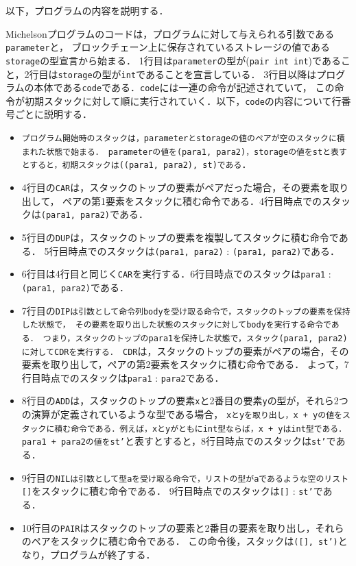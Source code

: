 \documentclass{kuisthesis}
\begin{document}
以下，プログラムの内容を説明する．

Michelsonプログラムのコードは，プログラムに対して与えられる引数である{\tt parameter}と，
ブロックチェーン上に保存されているストレージの値である{\tt storage}の型宣言から始まる．
1行目は{\tt parameter}の型が({\tt pair int int})であること，2行目は{\tt storage}の型が{\tt int}であることを宣言している．
3行目以降はプログラムの本体である{\tt code}である．{\tt code}には一連の命令が記述されていて，
この命令が初期スタックに対して順に実行されていく．以下，{\tt code}の内容について行番号ごとに説明する．

\begin{itemize}
  \item {\tt プログラム開始時のスタックは，parameterとstorageの値のペアが空のスタックに積まれた状態で始まる．
  parameterの値を(para1, para2)，storageの値をstと表すとすると，初期スタックは((para1, para2), st)である}．
  \item 4行目の{\tt CAR}は，スタックのトップの要素がペアだった場合，その要素を取り出して，
  ペアの第1要素をスタックに積む命令である．4行目時点でのスタックは{\tt (para1, para2)}である．
  \item 5行目の{\tt DUP}は，スタックのトップの要素を複製してスタックに積む命令である．
  5行目時点でのスタックは{\tt (para1, para2)} : {\tt (para1, para2)}である．
  \item 6行目は4行目と同じく{\tt CAR}を実行する．6行目時点でのスタックは{\tt para1} : {\tt (para1, para2)}である．
  \item 7行目の{\tt DIPは引数として命令列bodyを受け取る命令で，スタックのトップの要素を保持した状態で，
  その要素を取り出した状態のスタックに対してbodyを実行する命令である．
  つまり，スタックのトップのpara1を保持した状態で，スタック(para1, para2)に対してCDRを実行する．
  CDR}は，スタックのトップの要素がペアの場合，その要素を取り出して，ペアの第2要素をスタックに積む命令である．
  よって，7行目時点でのスタックは{\tt para1} : {\tt para2}である．
  \item 8行目の{\tt ADD}は，スタックのトップの要素{\tt x}と2番目の要素{\tt y}の型が，それら2つの演算が定義されているような型である場合，
  {\tt xとyを取り出し，x + yの値をスタックに積む命令である．例えば，xとyがともにint型ならば，x + yはint型である．
  para1 + para2の値をst'}と表すとすると，8行目時点でのスタックは{\tt st'}である．
  \item 9行目の{\tt NILは引数として型aを受け取る命令で，リストの型がaであるような空のリスト[]}をスタックに積む命令である．
  9行目時点でのスタックは{\tt []} : {\tt st'}である．
  \item 10行目の{\tt PAIR}はスタックのトップの要素と2番目の要素を取り出し，それらのペアをスタックに積む命令である．
  この命令後，スタックは{\tt ([], st')}となり，プログラムが終了する．
\end{itemize}
\end{document}
